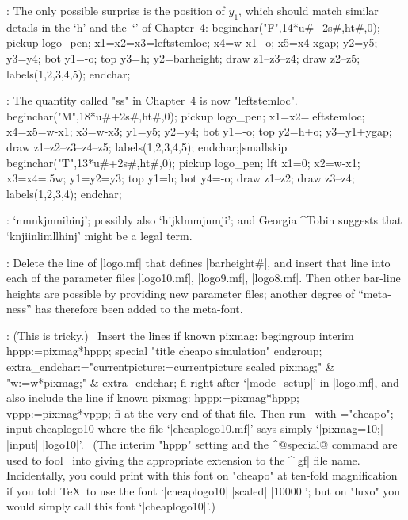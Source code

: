 :
 The only possible surprise is the position of $y_1$,
which should match similar details in the `{\manual h}'
and the~`\kern1pt' of Chapter~4:
\begintt
beginchar("F",14*u#+2s#,ht#,0); pickup logo_pen;
x1=x2=x3=leftstemloc; x4=w-x1+o; x5=x4-xgap;
y2=y5; y3=y4; bot y1=-o; top y3=h; y2=barheight;
draw z1--z3--z4; draw z2--z5;
labels(1,2,3,4,5); endchar;
\endtt

:
 The quantity called "ss" in Chapter~4 is now "leftstemloc".
\begintt
beginchar("M",18*u#+2s#,ht#,0); pickup logo_pen;
x1=x2=leftstemloc; x4=x5=w-x1; x3=w-x3;
y1=y5; y2=y4; bot y1=-o; top y2=h+o; y3=y1+ygap;
draw z1--z2--z3--z4--z5;
labels(1,2,3,4,5); endchar;|smallskip
beginchar("T",13*u#+2s#,ht#,0); pickup logo_pen;
lft x1=0; x2=w-x1; x3=x4=.5w;
y1=y2=y3; top y1=h; bot y4=-o;
draw z1--z2; draw z3--z4;
labels(1,2,3,4); endchar;
\endtt

:
 `{\manual nmnkjmnihinj\/}'; possibly also `{\manual hijklmmjnmji}';
and Georgia ^{Tobin} suggests that `{\manual knjiinlimllhinj\/}'
might be a legal term.

:
 Delete the line of |logo.mf| that defines |barheight#|, and
insert that line into each of the parameter files |logo10.mf|, |logo9.mf|,
|logo8.mf|. Then other bar-line heights are possible by providing new
parameter files; another degree of ``meta-ness'' has therefore been added
to the meta-font.

:
 (This is tricky.) \ Insert the lines
\begintt
if known pixmag: begingroup interim hppp:=pixmag*hppp;
 special "title cheapo simulation" endgroup;
 extra_endchar:="currentpicture:=currentpicture scaled pixmag;"
  & "w:=w*pixmag;" & extra_endchar; fi
\endtt
right after `|mode_setup|' in |logo.mf|, and also include the line
\begintt
if known pixmag: hppp:=pixmag*hppp; vppp:=pixmag*vppp; fi
\endtt
at the very end of that file. Then run \MF\ with
\begintt
\mode="cheapo"; input cheaplogo10
\endtt
where the file `|cheaplogo10.mf|' says simply `|pixmag=10;| |input| |logo10|'.
\ (The interim "hppp" setting and the ^@special@ command are
used to fool \MF\ into giving the appropriate extension to the
^|gf| file name.  Incidentally, you could print with this font on "cheapo"
at ten-fold magnification if you told \TeX\ to use the font `|cheaplogo10|
|scaled| |10000|'; but on "luxo" you would simply call this font
`|cheaplogo10|'.)

